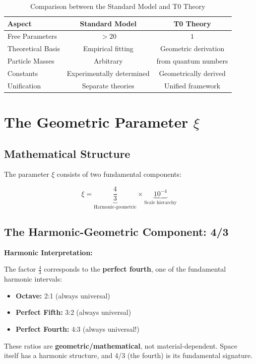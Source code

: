 	\begin{table}[htbp]
		\centering
		
		\begin{tabular}{lcc}
			\toprule
			\textbf{Aspect} & \textbf{Standard Model} & \textbf{T0 Theory} \\
			\midrule
			Free Parameters & $> 20$ & $1$ \\
			Theoretical Basis & Empirical fitting & Geometric derivation \\
			Particle Masses & Arbitrary & from quantum numbers \\
			Constants & Experimentally determined & Geometrically derived \\
			Unification & Separate theories & Unified framework \\
			\bottomrule
		\end{tabular}
		\caption{Comparison between the Standard Model and T0 Theory}
	\end{table}
	
	\section{The Geometric Parameter $\xi$}
	
	\subsection{Mathematical Structure}
	
	The parameter $\xi$ consists of two fundamental components:
	
	\begin{equation}
		\xi = \underbrace{\frac{4}{3}}_{\text{Harmonic-geometric}} \times \underbrace{10^{-4}}_{\text{Scale hierarchy}}
		\label{eq:xi_components}
	\end{equation}
	
	\subsection{The Harmonic-Geometric Component: 4/3}
	
	\begin{alternative}
		\textbf{Harmonic Interpretation:}
		
		The factor $\frac{4}{3}$ corresponds to the \textbf{perfect fourth}, one of the fundamental harmonic intervals:
		\begin{itemize}
			\item \textbf{Octave:} 2:1 (always universal)
			\item \textbf{Perfect Fifth:} 3:2 (always universal)  
			\item \textbf{Perfect Fourth:} 4:3 (always universal!)
		\end{itemize}
		
		These ratios are \textbf{geometric/mathematical}, not material-dependent. Space itself has a harmonic structure, and 4/3 (the fourth) is its fundamental signature.
	\end{alternative}
	

